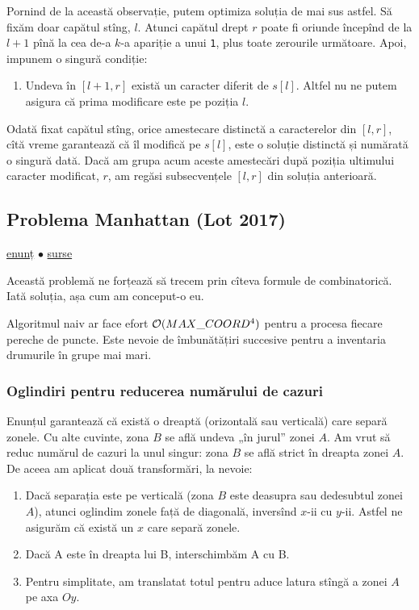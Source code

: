 \documentclass[../main.tex]{subfiles}
\begin{document}
Pornind de la această observație, putem optimiza soluția de mai sus astfel. Să fixăm doar capătul stîng, $l$. Atunci capătul drept $r$ poate fi oriunde începînd de la $l+1$ pînă la cea de-a $k$-a apariție a unui \texttt{1}, plus toate zerourile următoare. Apoi, impunem o singură condiție:

\begin{enumerate}
  \item Undeva în $[l+1,r]$ există un caracter diferit de $s[l]$. Altfel nu ne putem  asigura că prima modificare este pe poziția $l$.
\end{enumerate}

Odată fixat capătul stîng, orice amestecare distinctă a caracterelor din $[l,r]$, cîtă vreme garantează că îl modifică pe $s[l]$, este o soluție distinctă și numărată o singură dată. Dacă am grupa acum aceste amestecări după poziția ultimului caracter modificat, $r$, am regăsi subsecvențele $[l,r]$ din soluția anterioară.

\subsection{Problema Manhattan (Lot 2017)}
\label{problem:manhattan}

\href{https://kilonova.ro/problems/518}{enunț}
$\bullet$
\hyperref[code:manhattan]{surse}

Această problemă ne forțează să trecem prin cîteva formule de combinatorică. Iată soluția, așa cum am conceput-o eu.

Algoritmul naiv ar face efort $\mathcal{O}(MAX\_COORD^4)$ pentru a procesa fiecare pereche de puncte. Este nevoie de îmbunătățiri succesive pentru a inventaria drumurile în grupe mai mari.

\subsubsection*{Oglindiri pentru reducerea numărului de cazuri}

Enunțul garantează că există o dreaptă (orizontală sau verticală) care separă zonele. Cu alte cuvinte, zona $B$ se află undeva „în jurul” zonei $A$. Am vrut să reduc numărul de cazuri la unul singur: zona $B$ se află strict în dreapta zonei $A$. De aceea am aplicat două transformări, la nevoie:

\begin{enumerate}
  \item Dacă separația este pe verticală (zona $B$ este deasupra sau dedesubtul zonei $A$), atunci oglindim zonele față de diagonală, inversînd $x$-ii cu $y$-ii. Astfel ne asigurăm că există un $x$ care separă zonele.

  \item Dacă A este în dreapta lui B, interschimbăm A cu B.

  \item Pentru simplitate, am translatat totul pentru aduce latura stîngă a zonei $A$ pe axa $Oy$.
\end{enumerate}
\end{document}
